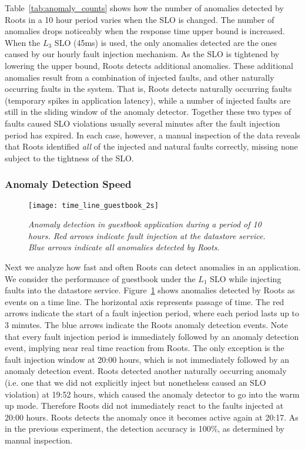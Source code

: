 Table~\ref{tab:anomaly_counts} shows how the number of anomalies detected by 
Roots in a 10 hour period varies when the SLO is changed. The number of anomalies
drops noticeably when the response time upper bound is increased. When the $L_3$
SLO (45ms) is used, the only anomalies detected are the ones
caused by our hourly fault injection mechanism. As the SLO is tightened by lowering the upper bound,
Roots detects additional anomalies. These additional anomalies
result from a combination of injected faults, and other naturally occurring faults
in the system. That is, Roots detects naturally occurring
faults (temporary spikes in application latency), while a number of injected faults
are still in the sliding window of the anomaly detector. Together these two types of
faults caused SLO violations usually several minutes after the fault injection period
has expired.  In each case, however, a manual inspection of the data reveals
that Roots identified \textit{all} of the injected and natural faults correctly,
missing none subject to the tightness of the SLO.

\subsubsection{Anomaly Detection Speed}

\begin{figure}
\centering
\texttt{[image: time\_line\_guestbook\_2s]}
\vspace{-0.2in}
\caption{\textit{Anomaly detection in guestbook application during a period of 10 hours. 
Red arrows indicate fault injection
at the datastore service. Blue arrows indicate all anomalies detected by
Roots.
}}
\label{fig:time_line_guestbook_2s}
\end{figure}

Next we analyze how fast and often Roots can detect anomalies in an application. We
consider the performance of guestbook under the $L_1$ SLO while 
injecting faults into the datastore service. Figure~\ref{fig:time_line_guestbook_2s} shows
anomalies detected by Roots as events on a time line. The horizontal axis represents 
passage of time. The red arrows indicate the start of a fault injection period, where each
period lasts up to 3 minutes.
The blue arrows indicate the Roots anomaly detection events.
Note that every fault injection period is immediately followed by an anomaly
detection event, implying near real time reaction from Roots. The only exception is the fault
injection window at 20:00 hours, which is not immediately followed by an anomaly 
detection event. Roots detected another naturally occurring anomaly
(i.e. one
that we did not explicitly inject but nonetheless caused an SLO violation) at 19:52 hours,
which caused the anomaly detector to go into the warm up mode. Therefore Roots
did not immediately react to the faults injected at 20:00 hours. Roots detects the anomaly once it becomes
active again at 20:17. As in the previous
experiment, the detection accuracy is 100\%, as determined by manual
inspection.

